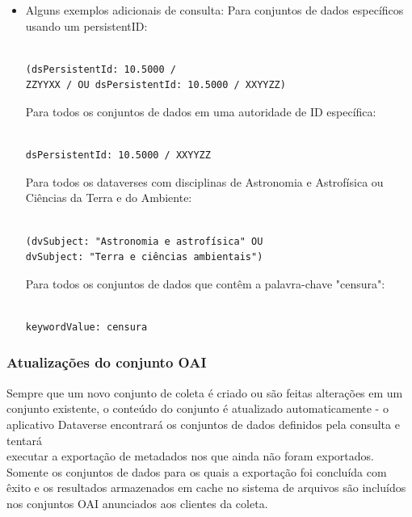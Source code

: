 \documentclass[12pt,hidelinks]{article}
\begin{document}
\begin{itemize}
\begin{verbatim}
\end{verbatim}

 \item Alguns exemplos adicionais de consulta:
Para conjuntos de dados específicos usando um persistentID:

\begin{verbatim}

(dsPersistentId: 10.5000 / 
ZZYYXX / OU dsPersistentId: 10.5000 / XXYYZZ)

\end{verbatim}

Para todos os conjuntos de dados em uma autoridade de ID específica:

 \begin{verbatim}

dsPersistentId: 10.5000 / XXYYZZ

\end{verbatim}

Para todos os dataverses com disciplinas de Astronomia e Astrofísica ou Ciências da Terra e do Ambiente:

\begin{verbatim}

(dvSubject: "Astronomia e astrofísica" OU
dvSubject: "Terra e ciências ambientais")

\end{verbatim}

Para todos os conjuntos de dados que contêm a palavra-chave "censura":

\begin{verbatim}

keywordValue: censura

\end{verbatim}

\end{itemize}

\subsubsection{Atualizações do conjunto OAI}

\qquad Sempre que um novo conjunto de coleta é criado ou são feitas alterações em um conjunto existente, o conteúdo do conjunto é atualizado automaticamente - o aplicativo Dataverse encontrará os conjuntos de dados definidos pela consulta e tentará \\executar a exportação de metadados nos que ainda não foram exportados. Somente os conjuntos de dados para os quais a exportação foi concluída com êxito e os resultados armazenados em cache no sistema de arquivos são incluídos nos conjuntos OAI anunciados aos clientes da coleta.
\end{document}
